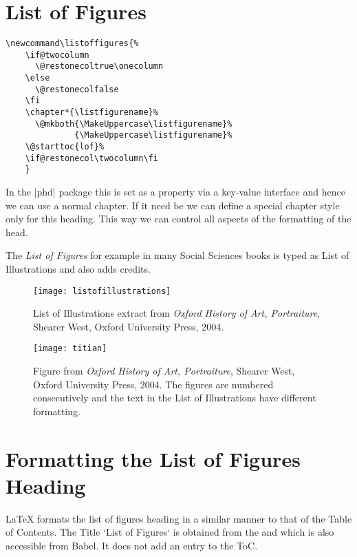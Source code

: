 \section{List of Figures}
\begin{tcolorbox}
\begin{lstlisting}
\newcommand\listoffigures{%
    \if@twocolumn
      \@restonecoltrue\onecolumn
    \else
      \@restonecolfalse
    \fi
    \chapter*{\listfigurename}%
      \@mkboth{\MakeUppercase\listfigurename}%
              {\MakeUppercase\listfigurename}%
    \@starttoc{lof}%
    \if@restonecol\twocolumn\fi
    }
\end{lstlisting}
\end{tcolorbox}


In the |phd| package this is set as a property via a key-value interface and hence we can use a normal chapter. If it need be we can define a special chapter style only for this heading. This way we can control all aspects of the formatting of the head.

\begin{macro}{\listfigurename}
The \textit{List of Figures} for example in many Social Sciences books is typed as {List of Illustrations} and also adds credits.
\end{macro}




\begin{figure}[htp]
\texttt{[image: listofillustrations]}
\caption{List of Illustrations extract from \textit{Oxford History of Art, Portraiture}, Shearer West, Oxford University Press, 2004.}
\end{figure}
\begin{figure}[htp]
\texttt{[image: titian]}
\centering
\caption{Figure from \textit{Oxford History of Art, Portraiture}, Shearer West, Oxford University Press, 2004. The figures are numbered consecutively and the text in the List of Illustrations have different formatting.}
\end{figure}

\section{Formatting the List of Figures Heading}

LaTeX formats the list of figures heading in a similar manner to that of the Table of Contents. The Title `List of Figures` is obtained from the  and which is also accessible from Babel. It does not add an entry to the ToC.



